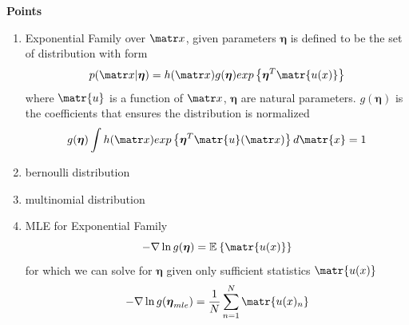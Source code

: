 \documentclass[11pt]{article}
\begin{document}

\begin{defn*}
    \textbf{Points}
    \begin{enumerate}
        \item Exponential Family over $\bx$, given parameters $\boldsymbol{\eta}$ is defined to be the set of distribution with form 
        \[
            p(\bx | \boldsymbol{\eta})
            = h(\bx) g(\boldsymbol{\eta}) \exponents{\boldsymbol{\eta}^T \matr{u(x)}}    
        \]
        where $\matr{u}$ is a function of $\bx$, $\boldsymbol{\eta}$ are natural parameters. $g(\boldsymbol{\eta})$ is the coefficients that ensures the distribution is normalized 
        \[
            g(\boldsymbol{\eta}) \int h(\bx) \exponents{\boldsymbol{\eta}^T \matr{u}(\bx)} d\matr{x} = 1
        \]
        \item bernoulli distribution 
        \item multinomial distribution
        \item MLE for Exponential Family 
        \[
            -\nabla \ln{g(\boldsymbol{\eta})} = \E{\matr{u(x)}}
        \]
        for which we can solve for $\boldsymbol{\eta}$ given only sufficient statistics $\matr{u(x)}$
        \[
            -\nabla \ln{g(\boldsymbol{\eta}_{mle})} = \frac{1}{N} \sum_{n=1}^N \matr{u(x)_n}
        \]
    \end{enumerate}
\end{defn*}
\end{document}

